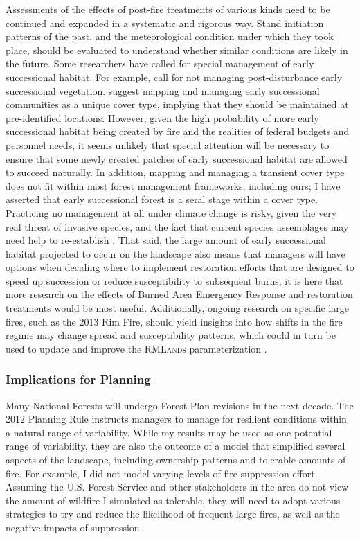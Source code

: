 Assessments of the effects of post-fire treatments of various kinds need to be continued and expanded in a systematic and rigorous way. Stand initiation patterns of the past, and the meteorological condition under which they took place, should be evaluated to understand whether similar conditions are likely in the future. Some researchers have called for special management of early successional habitat. For example, \citet{Dellasala2014} call for not managing post-disturbance early successional vegetation. \citet{Swanson2011} suggest mapping and managing early successional communities as a unique cover type, implying that they should be maintained at pre-identified locations. However, given the high probability of more early successional habitat being created by fire and the realities of federal budgets and personnel needs, it seems unlikely that special attention will be necessary to ensure that some newly created patches of early successional habitat are allowed to succeed naturally. In addition, mapping and managing a transient cover type does not fit within most forest management frameworks, including ours; I have asserted that early successional forest is a seral stage within a cover type. Practicing no management at all under climate change is risky, given the very real threat of invasive species, and the fact that current species assemblages may need help to re-establish \citep{Stephens2010}. That said, the large amount of early successional habitat projected to occur on the landscape also means that managers will have options when deciding where to implement restoration efforts that are designed to speed up succession or reduce susceptibility to subsequent burns; it is here that more research on the effects of Burned Area Emergency Response and restoration treatments would be most useful. Additionally, ongoing research on specific large fires, such as the 2013 Rim Fire, should yield insights into how shifts in the fire regime may change spread and susceptibility patterns, which could in turn be used to update and improve the \textsc{RMLands} parameterization \citep{Lydersen2014}.




\subsubsection*{Implications for Planning}
Many National Forests will undergo Forest Plan revisions in the next decade. The 2012 Planning Rule instructs managers to manage for resilient conditions within a natural range of variability. While my results may be used as one potential range of variability, they are also the outcome of a model that simplified several aspects of the landscape, including ownership patterns and tolerable amounts of fire. For example, I did not model varying levels of fire suppression effort. Assuming the U.S. Forest Service and other stakeholders in the area do not view the amount of wildfire I simulated as tolerable, they will need to adopt various strategies to try and reduce the likelihood of frequent large fires, as well as the negative impacts of suppression. 

